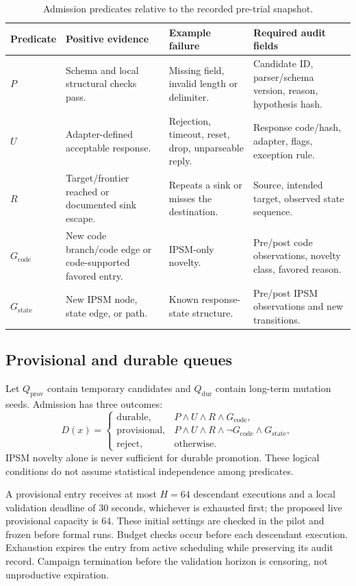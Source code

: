 \documentclass[final,5p,times,number]{elsarticle}
\newcommand{\gcode}{G_{\mathrm{code}}}
\newcommand{\gstate}{G_{\mathrm{state}}}
\begin{document}
\begin{table}[t]
\centering\small
\caption{Admission predicates relative to the recorded pre-trial snapshot.}
\label{tab:predicates}
\begin{tabularx}{\textwidth}{l Y Y Y}
\toprule
Predicate & Positive evidence & Example failure & Required audit fields \\
\midrule
$P$ & Schema and local structural checks pass. & Missing field, invalid length or delimiter. & Candidate ID, parser/schema version, reason, hypothesis hash. \\
$U$ & Adapter-defined acceptable response. & Rejection, timeout, reset, drop, unparseable reply. & Response code/hash, adapter, flags, exception rule. \\
$R$ & Target/frontier reached or documented sink escape. & Repeats a sink or misses the destination. & Source, intended target, observed state sequence. \\
$\gcode$ & New code branch/code edge or code-supported favored entry. & IPSM-only novelty. & Pre/post code observations, novelty class, favored reason. \\
$\gstate$ & New IPSM node, state edge, or path. & Known response-state structure. & Pre/post IPSM observations and new transitions. \\
\bottomrule
\end{tabularx}
\end{table}

\subsection{Provisional and durable queues}
Let $Q_{\mathrm{prov}}$ contain temporary candidates and $Q_{\mathrm{dur}}$ contain long-term mutation seeds. Admission has three outcomes:
\begin{equation}
D(x)=
\begin{cases}
\mathrm{durable}, & P\land U\land R\land\gcode,\\
\mathrm{provisional}, & P\land U\land R\land\neg\gcode\land\gstate,\\
\mathrm{reject}, & \text{otherwise}.
\end{cases}\label{eq:admission}
\end{equation}
IPSM novelty alone is never sufficient for durable promotion. These logical conditions do not assume statistical independence among predicates.

A provisional entry receives at most $H=64$ descendant executions and a local validation deadline of 30 seconds, whichever is exhausted first; the proposed live provisional capacity is 64. These initial settings are checked in the pilot and frozen before formal runs. Budget checks occur before each descendant execution. Exhaustion expires the entry from active scheduling while preserving its audit record. Campaign termination before the validation horizon is censoring, not unproductive expiration.
\end{document}
